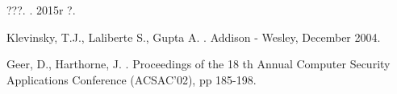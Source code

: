 \documentclass[pdflatex,11pt]{others/aghdpl}
\author{Jakub Syrek}
\date{2016}
\begin{document}










% 
% 


% 

\begin{thebibliography}{1}

???.
.
\newblock 2015r ?.


Klevinsky, T.J., Laliberte S., Gupta A.
.
\newblock Addison - Wesley, December 2004.

Geer, D., Harthorne, J.
.
\newblock Proceedings of the 18 th Annual Computer Security Applications Conference (ACSAC'02), pp 185-198.




\end{thebibliography}
\end{document}
